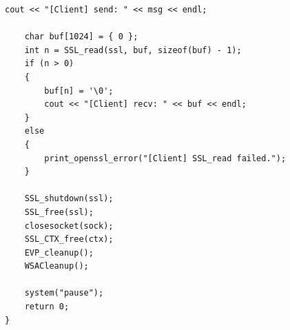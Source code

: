 ﻿\documentclass[12pt]{ctexart}
\begin{document}
\begin{lstlisting}[escapechar=c++|]
    cout << "[Client] send: " << msg << endl;

    char buf[1024] = { 0 };
    int n = SSL_read(ssl, buf, sizeof(buf) - 1);
    if (n > 0)
    {
        buf[n] = '\0';
        cout << "[Client] recv: " << buf << endl;
    }
    else
    {
        print_openssl_error("[Client] SSL_read failed.");
    }

    SSL_shutdown(ssl);
    SSL_free(ssl);
    closesocket(sock);
    SSL_CTX_free(ctx);
    EVP_cleanup();
    WSACleanup();

    system("pause");
    return 0;
}
\end{lstlisting}
\end{document}
